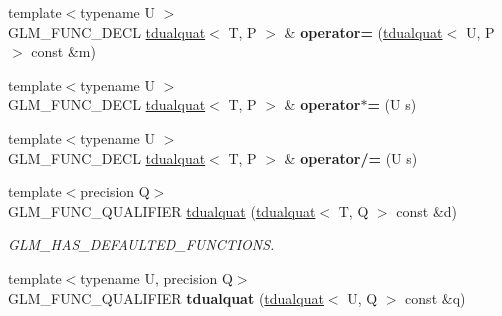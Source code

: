 \begin{DoxyCompactItemize}
\item 
\hypertarget{structglm_1_1tdualquat_a88370687edccdd5b6e62c9e314bc95c2}{{\footnotesize template$<$typename U $>$ }\\G\-L\-M\-\_\-\-F\-U\-N\-C\-\_\-\-D\-E\-C\-L \hyperlink{structglm_1_1tdualquat}{tdualquat}$<$ T, P $>$ \& {\bfseries operator=} (\hyperlink{structglm_1_1tdualquat}{tdualquat}$<$ U, P $>$ const \&m)}\label{structglm_1_1tdualquat_a88370687edccdd5b6e62c9e314bc95c2}

\item 
\hypertarget{structglm_1_1tdualquat_a2ca62c45a69cd875c2d265543ddbd2de}{{\footnotesize template$<$typename U $>$ }\\G\-L\-M\-\_\-\-F\-U\-N\-C\-\_\-\-D\-E\-C\-L \hyperlink{structglm_1_1tdualquat}{tdualquat}$<$ T, P $>$ \& {\bfseries operator$\ast$=} (U s)}\label{structglm_1_1tdualquat_a2ca62c45a69cd875c2d265543ddbd2de}

\item 
\hypertarget{structglm_1_1tdualquat_ab4cdb5a086d64909be52d436bd05ec11}{{\footnotesize template$<$typename U $>$ }\\G\-L\-M\-\_\-\-F\-U\-N\-C\-\_\-\-D\-E\-C\-L \hyperlink{structglm_1_1tdualquat}{tdualquat}$<$ T, P $>$ \& {\bfseries operator/=} (U s)}\label{structglm_1_1tdualquat_ab4cdb5a086d64909be52d436bd05ec11}

\item 
\hypertarget{structglm_1_1tdualquat_ac7bd63eee979bac07ff5e8db5a4b9141}{{\footnotesize template$<$precision Q$>$ }\\G\-L\-M\-\_\-\-F\-U\-N\-C\-\_\-\-Q\-U\-A\-L\-I\-F\-I\-E\-R \hyperlink{structglm_1_1tdualquat_ac7bd63eee979bac07ff5e8db5a4b9141}{tdualquat} (\hyperlink{structglm_1_1tdualquat}{tdualquat}$<$ T, Q $>$ const \&d)}\label{structglm_1_1tdualquat_ac7bd63eee979bac07ff5e8db5a4b9141}

\begin{DoxyCompactList}\small\item\em G\-L\-M\-\_\-\-H\-A\-S\-\_\-\-D\-E\-F\-A\-U\-L\-T\-E\-D\-\_\-\-F\-U\-N\-C\-T\-I\-O\-N\-S. \end{DoxyCompactList}\item 
\hypertarget{structglm_1_1tdualquat_aca4a77830441c69c03731a331fe3e1ec}{{\footnotesize template$<$typename U, precision Q$>$ }\\G\-L\-M\-\_\-\-F\-U\-N\-C\-\_\-\-Q\-U\-A\-L\-I\-F\-I\-E\-R {\bfseries tdualquat} (\hyperlink{structglm_1_1tdualquat}{tdualquat}$<$ U, Q $>$ const \&q)}\label{structglm_1_1tdualquat_aca4a77830441c69c03731a331fe3e1ec}


\end{DoxyCompactItemize}
